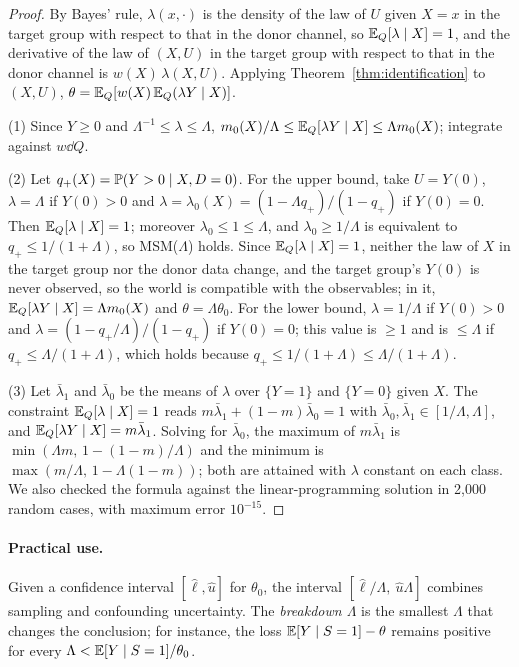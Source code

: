 \begin{proof}
By Bayes' rule, $\lambda(x,\cdot)$ is the density of the law of $U$ given $X=x$ in the target group with respect to that in the donor channel, so $\mathbb{E}_Q[\lambda\mid X]=1$, and the derivative of the law of $(X,U)$ in the target group with respect to that in the donor channel is $w(X)\,\lambda(X,U)$. Applying Theorem~\ref{thm:identification} to $(X,U)$, $\theta=\mathbb{E}_Q[w(X)\,\mathbb{E}_Q(\lambda Y\mid X)]$.

(1) Since $Y\ge0$ and $\Lambda^{-1}\le\lambda\le\Lambda$, $m_0(X)/\Lambda\le\mathbb{E}_Q[\lambda Y\mid X]\le\Lambda m_0(X)$; integrate against $w\dd Q$.

(2) Let $q_+(X)=\mathbb{P}(Y>0\mid X,D=0)$. For the upper bound, take $U=Y(0)$, $\lambda=\Lambda$ if $Y(0)>0$ and $\lambda=\lambda_0(X)=(1-\Lambda q_+)/(1-q_+)$ if $Y(0)=0$. Then $\mathbb{E}_Q[\lambda\mid X]=1$; moreover $\lambda_0\le1\le\Lambda$, and $\lambda_0\ge1/\Lambda$ is equivalent to $q_+\le1/(1+\Lambda)$, so MSM($\Lambda$) holds. Since $\mathbb{E}_Q[\lambda\mid X]=1$, neither the law of $X$ in the target group nor the donor data change, and the target group's $Y(0)$ is never observed, so the world is compatible with the observables; in it, $\mathbb{E}_Q[\lambda Y\mid X]=\Lambda m_0(X)$ and $\theta=\Lambda\theta_0$. For the lower bound, $\lambda=1/\Lambda$ if $Y(0)>0$ and $\lambda=(1-q_+/\Lambda)/(1-q_+)$ if $Y(0)=0$; this value is $\ge1$ and is $\le\Lambda$ if $q_+\le\Lambda/(1+\Lambda)$, which holds because $q_+\le1/(1+\Lambda)\le\Lambda/(1+\Lambda)$.

(3) Let $\bar\lambda_1$ and $\bar\lambda_0$ be the means of $\lambda$ over $\{Y=1\}$ and $\{Y=0\}$ given $X$. The constraint $\mathbb{E}_Q[\lambda\mid X]=1$ reads $m\bar\lambda_1+(1-m)\bar\lambda_0=1$ with $\bar\lambda_0,\bar\lambda_1\in[1/\Lambda,\Lambda]$, and $\mathbb{E}_Q[\lambda Y\mid X]=m\bar\lambda_1$. Solving for $\bar\lambda_0$, the maximum of $m\bar\lambda_1$ is $\min(\Lambda m,\,1-(1-m)/\Lambda)$ and the minimum is $\max(m/\Lambda,\,1-\Lambda(1-m))$; both are attained with $\lambda$ constant on each class. We also checked the formula against the linear-programming solution in 2{,}000 random cases, with maximum error $10^{-15}$.
\end{proof}

\paragraph{Practical use.} Given a confidence interval $[\hat\ell,\hat u]$ for $\theta_0$, the interval $[\hat\ell/\Lambda,\ \hat u\Lambda]$ combines sampling and confounding uncertainty. The \emph{breakdown $\Lambda$} is the smallest $\Lambda$ that changes the conclusion; for instance, the loss $\mathbb{E}[Y\mid S=1]-\theta$ remains positive for every $\Lambda<\mathbb{E}[Y\mid S=1]/\theta_0$.

